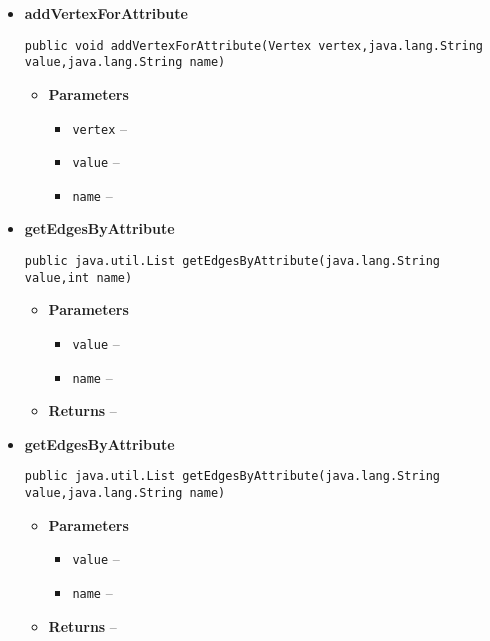 {{{{{{{{{{{{{{{{{{{{\begin{itemize}
{\begin{itemize}
{\begin{itemize}
   \item{
\texttt{vertex} -- }
   \item{
\texttt{value} -- }
   \item{
\texttt{name} -- }
  \end{itemize}
}%
\end{itemize}
}%
\item{ 
{\bf  addVertexForAttribute}\\
\begin{lstlisting}[frame=none]
public void addVertexForAttribute(Vertex vertex,java.lang.String value,java.lang.String name)\end{lstlisting} %
\begin{itemize}
\item{
{\bf  Parameters}
  \begin{itemize}
   \item{
\texttt{vertex} -- }
   \item{
\texttt{value} -- }
   \item{
\texttt{name} -- }
  \end{itemize}
}%
\end{itemize}
}%
\item{ 
{\bf  getEdgesByAttribute}\\
\begin{lstlisting}[frame=none]
public java.util.List getEdgesByAttribute(java.lang.String value,int name)\end{lstlisting} %
\begin{itemize}
\item{
{\bf  Parameters}
  \begin{itemize}
   \item{
\texttt{value} -- }
   \item{
\texttt{name} -- }
  \end{itemize}
}%
\item{{\bf  Returns} -- 
 
}%
\end{itemize}
}%
\item{ 
{\bf  getEdgesByAttribute}\\
\begin{lstlisting}[frame=none]
public java.util.List getEdgesByAttribute(java.lang.String value,java.lang.String name)\end{lstlisting} %
\begin{itemize}
\item{
{\bf  Parameters}
  \begin{itemize}
   \item{
\texttt{value} -- }
   \item{
\texttt{name} -- }
  \end{itemize}
}%
\item{{\bf  Returns} -- 
 
}
\end{itemize}}
\end{itemize}}}}}}}}}}}}}}}}}}}}}
